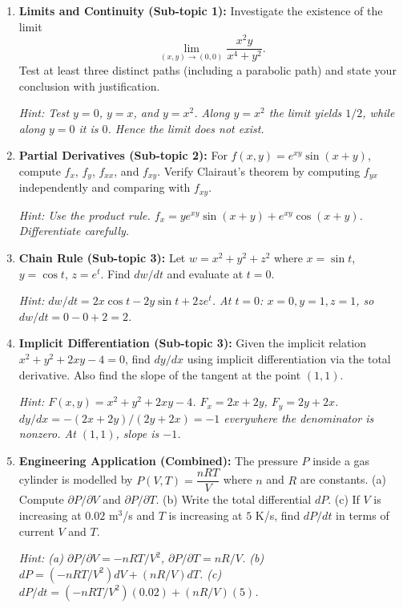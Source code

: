\documentclass[12pt,a4paper]{article}
\begin{document}
\begin{enumerate}
  \item \textbf{Limits and Continuity (Sub-topic 1):} Investigate the existence of the limit
  \[
  \lim_{(x,y)\to(0,0)} \frac{x^2 y}{x^4 + y^2}.
  \]
  Test at least three distinct paths (including a parabolic path) and state your conclusion with justification.

  \textit{Hint: Test \(y = 0\), \(y = x\), and \(y = x^2\). Along \(y=x^2\) the limit yields \(1/2\), while along \(y=0\) it is \(0\). Hence the limit does not exist.}

  \item \textbf{Partial Derivatives (Sub-topic 2):} For \(f(x,y) = e^{xy} \sin(x+y)\), compute \(f_x\), \(f_y\), \(f_{xx}\), and \(f_{xy}\). Verify Clairaut's theorem by computing \(f_{yx}\) independently and comparing with \(f_{xy}\).

  \textit{Hint: Use the product rule. \(f_x = ye^{xy}\sin(x+y) + e^{xy}\cos(x+y)\). Differentiate carefully.}

  \item \textbf{Chain Rule (Sub-topic 3):} Let \(w = x^2 + y^2 + z^2\) where \(x = \sin t\), \(y = \cos t\), \(z = e^t\). Find \(dw/dt\) and evaluate at \(t = 0\).

  \textit{Hint: \(dw/dt = 2x\cos t - 2y\sin t + 2ze^t\). At \(t=0\): \(x=0, y=1, z=1\), so \(dw/dt = 0 - 0 + 2 = 2\).}

  \item \textbf{Implicit Differentiation (Sub-topic 3):} Given the implicit relation \(x^2 + y^2 + 2xy - 4 = 0\), find \(dy/dx\) using implicit differentiation via the total derivative. Also find the slope of the tangent at the point \((1, 1)\).

  \textit{Hint: \(F(x,y)=x^2+y^2+2xy-4\). \(F_x=2x+2y\), \(F_y=2y+2x\). \(dy/dx = -(2x+2y)/(2y+2x) = -1\) everywhere the denominator is nonzero. At \((1,1)\), slope is \(-1\).}

  \item \textbf{Engineering Application (Combined):} The pressure \(P\) inside a gas cylinder is modelled by \(P(V,T) = \dfrac{nRT}{V}\) where \(n\) and \(R\) are constants. (a) Compute \(\partial P/\partial V\) and \(\partial P/\partial T\). (b) Write the total differential \(dP\). (c) If \(V\) is increasing at \(0.02\) m\(^3\)/s and \(T\) is increasing at \(5\) K/s, find \(dP/dt\) in terms of current \(V\) and \(T\).

  \textit{Hint: (a) \(\partial P/\partial V = -nRT/V^2\), \(\partial P/\partial T = nR/V\). (b) \(dP = (-nRT/V^2)dV + (nR/V)dT\). (c) \(dP/dt = (-nRT/V^2)(0.02) + (nR/V)(5)\).}
\end{enumerate}
\end{document}
